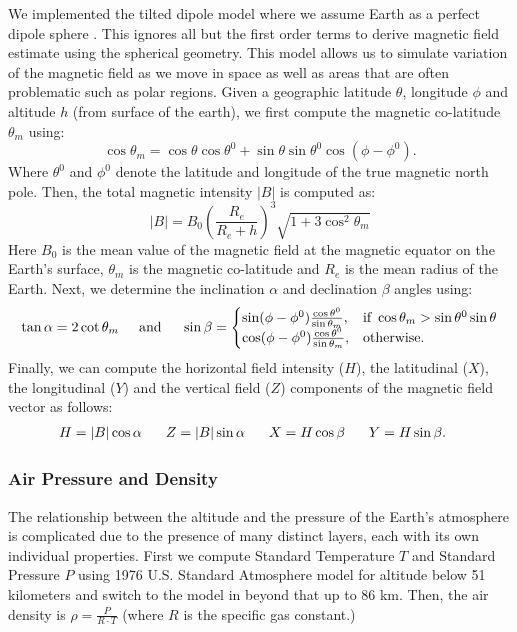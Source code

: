 \documentclass[graybox]{svmult}
\begin{document}
	We implemented the tilted dipole model where we assume Earth as a perfect dipole sphere \cite[pp 27-30]{lanza2006}. This ignores all but the first order terms to derive magnetic field estimate using the spherical geometry. This model allows us to simulate variation of the magnetic field as we move in space as well as areas that are often problematic such as polar regions. Given a geographic latitude $\theta$, longitude $\phi$ and altitude $h$ (from surface of the earth), we first compute the magnetic co-latitude $\theta_m$ using:
	\begin{equation*}
	\cos\theta_m = \cos\theta\cos\theta^0 + \sin\theta\sin\theta^0\cos(\phi-\phi^0).
	\end{equation*}
	Where $\theta^0$ and $\phi^0$ denote the latitude and longitude of the true magnetic north pole. Then, the total magnetic intensity $|B|$ is computed as:
	\begin{equation*}
	|B| = B_0 (\frac{R_e}{R_e + h})^3\sqrt{1 + 3\cos^2\theta_m}
	\end{equation*}
	Here $B_0$ is the mean value of the magnetic field at the magnetic equator on the Earth's surface, $\theta_m$ is the magnetic co-latitude and $R_e$ is the mean radius of the Earth. Next, we determine the inclination $\alpha$ and declination $\beta$ angles using: 
	\begin{equation*}
	\tan{\alpha} = 2\cot\theta_m \hspace{0.2in} \mbox{and} \hspace{0.2in} \sin\beta = 
	\begin{cases}
	\sin(\phi-\phi^0)\frac{\cos\theta^0}{\sin\theta_m}, & \mbox{if } \cos\theta_m > \sin\theta^0\sin\theta\\ 
	\cos(\phi-\phi^0)\frac{\cos\theta^0}{\sin\theta_m}, & \mbox{otherwise}.
	\end{cases}
	\end{equation*}
	Finally, we can compute the horizontal field intensity ($H$), the latitudinal ($X$), the longitudinal ($Y$) and the vertical field ($Z$) components of the magnetic field vector as follows:
	\begin{align*}
	H &= |B|\cos\alpha &\hspace{0.1in} Z &= |B|\sin\alpha &\hspace{0.1in} X &= H\cos\beta &\hspace{0.1in} Y &= H\sin\beta.
	\end{align*}
	
	\subsubsection{Air Pressure and Density}
	\label{sec:PressureAndAir}
	The relationship between the altitude and the pressure of the Earth's atmosphere is complicated due to the presence of many distinct layers, each with its own individual properties. First we compute Standard Temperature $T$ and Standard Pressure $P$ using 1976 U.S. Standard Atmosphere model \cite[eq 1.16, 1.17]{stull2016practical} for altitude below 51 kilometers and switch to the model in \cite[Table 4]{Braeunig} beyond that up to 86 km. Then, the air density is $\rho = \frac{P}{R \cdot T}$ (where $R$ is the specific gas constant.) 
	
\end{document}
